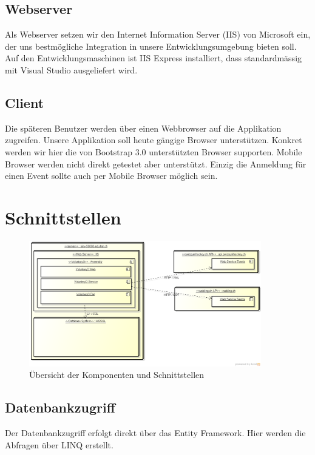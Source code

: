 		\subsection{Webserver}
		Als Webserver setzen wir den Internet Information Server (IIS) von Microsoft ein, der uns bestmögliche Integration in unsere Entwicklungsumgebung bieten soll. Auf den Entwicklungsmaschinen ist IIS Express installiert, dass standardmässig mit Visual Studio ausgeliefert wird.
		\subsection{Client}
		Die späteren Benutzer werden über einen Webbrowser auf die Applikation zugreifen. Unsere Applikation soll heute gängige Browser unterstützen. Konkret werden wir hier die von Bootstrap 3.0 unterstützten Browser supporten. Mobile Browser werden nicht direkt getestet aber unterstützt. Einzig die Anmeldung für einen Event sollte auch per Mobile Browser möglich sein.

	\section{Schnittstellen}
	    \begin{figure}[h]
	  		\vspace{-5pt}
	    	\centering
	    	\includegraphics[width=0.9\textwidth]{content/architekturdokumentation/images/uebersicht_der_komponenten.png}
	  		\vspace{-25pt}
	    	\caption{Übersicht der Komponenten und Schnittstellen}
		\end{figure}

		\subsection{Datenbankzugriff}
		Der Datenbankzugriff erfolgt direkt über das Entity Framework. Hier werden die Abfragen über LINQ erstellt.

